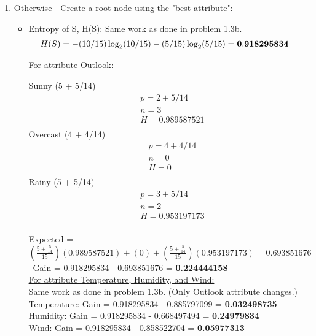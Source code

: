 \documentclass[8pt, fullpage,letterpaper]{article}
\begin{document}
\begin{enumerate}
\begin{enumerate}
\begin{enumerate}
\begin{enumerate}
			\item Otherwise - Create a root node using the "best attribute":
				\begin{itemize}
					\item Entropy of S, H(S): Same work as done in problem 1.3b.
						\begin{align*}
						    	& H(S) = - (10/15) \log_2 (10/15) - (5/15) \log_2 (5/15) = {\bf 0.918295834}
					      \end{align*}

						\underline {For attribute Outlook:} 
							\vspace{-5pt}
							\begin{multicols}{3}
								Sunny (5 + 5/14)
			 						\begin{align*}
									    	& p = 2  + 5/14\\
										& n = 3 \\
									    	& H = 0.989587521\\
								      \end{align*}
								Overcast (4 + 4/14)
			 						\begin{align*}
									    	& p = 4 + 4/14\\
										& n = 0 \\
									    	& H = 0\\
								      \end{align*}
								Rainy (5 + 5/14)
			 						\begin{align*}
									    	& p = 3 + 5/14\\
										& n = 2 \\
									    	& H = 0.953197173\\
								      \end{align*}
							\end{multicols}
							\vspace{-20pt}
							Expected = $(\frac{5+\frac{5}{14}}{15})(0.989587521)+(0)+(\frac{5+\frac{5}{14}}{15})(0.953197173) = 0.693851676$\
							Gain = 0.918295834 - 0.693851676 = {\bf 0.224444158}\\

						\underline {For attribute Temperature, Humidity, and Wind:} \\
							Same work as done in problem 1.3b. (Only Outlook attribute changes.)\\
							Temperature: Gain = 0.918295834 - 0.885797099 = {\bf 0.032498735}\\
							Humidity: Gain = 0.918295834 - 0.668497494 = {\bf 0.24979834}\\
							Wind: Gain = 0.918295834 - 0.858522704 = {\bf 0.05977313}\\


\end{itemize}
\end{enumerate}
\end{enumerate}
\end{enumerate}
\end{enumerate}
\end{document}
